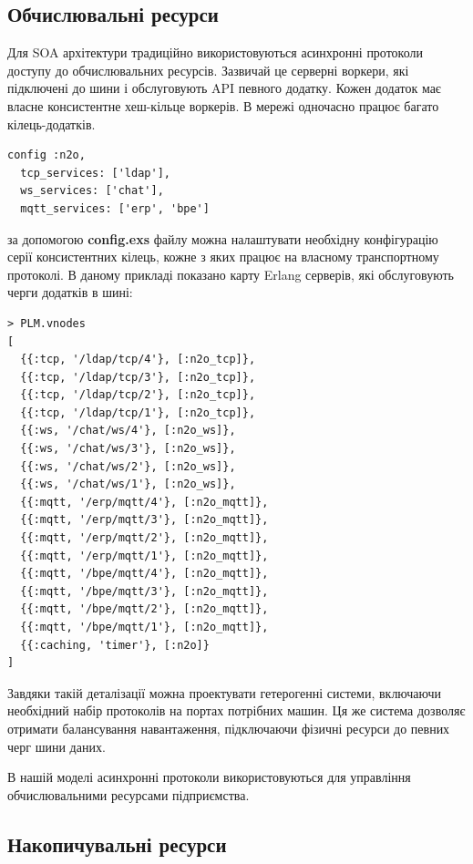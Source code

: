 \newpage
\subsection{Обчислювальні ресурси}

Для SOA архітектури традиційно використовуються асинхронні
протоколи доступу до обчислювальних ресурсів. Зазвичай це серверні
воркери, які підключені до шини і обслуговують API певного додатку.
Кожен додаток має власне консистентне хеш-кільце воркерів. В мережі
одночасно працює багато кілець-додатків.

\begin{lstlisting}
config :n2o,
  tcp_services: ['ldap'],
  ws_services: ['chat'],
  mqtt_services: ['erp', 'bpe']
   \end{lstlisting}

за допомогою {\bf config.exs} файлу можна налаштувати необхідну
конфігурацію серії консистентних кілець, кожне з яких працює
на власному транспортному протоколі. В даному прикладі показано
карту Erlang серверів, які обслуговують черги додатків в шині:

\begin{lstlisting}
> PLM.vnodes
[
  {{:tcp, '/ldap/tcp/4'}, [:n2o_tcp]},
  {{:tcp, '/ldap/tcp/3'}, [:n2o_tcp]},
  {{:tcp, '/ldap/tcp/2'}, [:n2o_tcp]},
  {{:tcp, '/ldap/tcp/1'}, [:n2o_tcp]},
  {{:ws, '/chat/ws/4'}, [:n2o_ws]},
  {{:ws, '/chat/ws/3'}, [:n2o_ws]},
  {{:ws, '/chat/ws/2'}, [:n2o_ws]},
  {{:ws, '/chat/ws/1'}, [:n2o_ws]},
  {{:mqtt, '/erp/mqtt/4'}, [:n2o_mqtt]},
  {{:mqtt, '/erp/mqtt/3'}, [:n2o_mqtt]},
  {{:mqtt, '/erp/mqtt/2'}, [:n2o_mqtt]},
  {{:mqtt, '/erp/mqtt/1'}, [:n2o_mqtt]},
  {{:mqtt, '/bpe/mqtt/4'}, [:n2o_mqtt]},
  {{:mqtt, '/bpe/mqtt/3'}, [:n2o_mqtt]},
  {{:mqtt, '/bpe/mqtt/2'}, [:n2o_mqtt]},
  {{:mqtt, '/bpe/mqtt/1'}, [:n2o_mqtt]},
  {{:caching, 'timer'}, [:n2o]}
]
\end{lstlisting}

Завдяки такій деталізації можна проектувати гетерогенні системи,
включаючи необхідний набір протоколів на портах потрібних машин. Ця же система
дозволяє отримати балансування навантаження, підключаючи фізичні ресурси
до певних черг шини даних.

В нашій моделі асинхронні протоколи використовуються для управління
обчислювальними ресурсами підприємства.

\newpage
\subsection{Накопичувальні ресурси}

